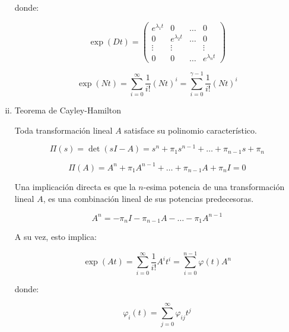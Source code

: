 \begin{enumerate}[i)]
            donde:

            \begin{equation}
                \exp{(D t)} =
                \begin{pmatrix}
                e^{\lambda_1 t} & 0 & \dots & 0 \\
                0 & e^{\lambda_2 t} & \dots & 0 \\
                \vdots & \vdots & & \vdots \\
                0 & 0 & \dots & e^{\lambda_n t}
                \end{pmatrix} \nonumber
            \end{equation}

            \begin{equation}
                \exp{(N t)} = \sum\limits_{i=0}^{\infty} \frac{1}{i!} (N t)^i = \sum\limits_{i=0}^{\gamma - 1} \frac{1}{i!} (N t)^i \nonumber
            \end{equation}

            \item Teorema de Cayley-Hamilton

            Toda transformación lineal $A$ satisface su polinomio característico.

            \begin{equation}
                \Pi(s) = \det{(sI - A)} = s^n + \pi_1 s^{n-1} + \dots + \pi_{n-1} s + \pi_n
            \end{equation}

            \begin{equation}
                \Pi(A) = A^n + \pi_1 A^{n-1} + \dots + \pi_{n-1} A + \pi_n I = 0
            \end{equation}

            Una implicación directa es que la $n$-esima potencia de una transformación lineal $A$, es una combinación lineal de sus potencias predecesoras.

            \begin{equation}
                A^n = - \pi_n I - \pi_{n-1} A - \dots - \pi_1 A^{n-1} \nonumber
            \end{equation}

            A su vez, esto implica:

            \begin{equation}
                \exp{(A t)} = \sum\limits_{i=0}^{\infty} \frac{1}{i!} A^i t^i = \sum\limits_{i=0}^{n-1} \varphi(t) A^n
            \end{equation}

            donde:

            \begin{equation}
                \varphi_i(t) = \sum\limits_{j=0}^{\infty} \varphi_{ij} t^j \nonumber
            \end{equation}

        \end{enumerate}
